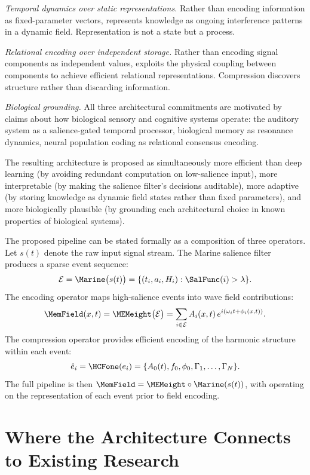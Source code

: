 \textit{Temporal dynamics over static representations.}
Rather than encoding information as fixed-parameter vectors,
\MEMeight{} represents knowledge as ongoing interference
patterns in a dynamic field. Representation is not a state
but a process.

\textit{Relational encoding over independent storage.}
Rather than encoding signal components as independent values,
\HCFone{} exploits the physical coupling between components
to achieve efficient relational representations. Compression
discovers structure rather than discarding information.

\textit{Biological grounding.} All three architectural
commitments are motivated by claims about how biological
sensory and cognitive systems operate: the auditory system
as a salience-gated temporal processor, biological memory
as resonance dynamics, neural population coding as
relational consensus encoding.

The resulting architecture is proposed as simultaneously
more efficient than deep learning (by avoiding redundant
computation on low-salience input), more interpretable
(by making the salience filter's decisions auditable),
more adaptive (by storing knowledge as dynamic field
states rather than fixed parameters), and more biologically
plausible (by grounding each architectural choice in known
properties of biological systems).

\begin{technote}
The proposed pipeline can be stated formally as a composition
of three operators. Let $s(t)$ denote the raw input signal
stream. The Marine salience filter produces a sparse event
sequence:
\[
  \mathcal{E} = \Marine\bigl(s(t)\bigr)
  = \{(t_i, a_i, H_i) : \SalFunc(i) > \lambda\}.
\]
The \MEMeight{} encoding operator maps high-salience events
into wave field contributions:
\[
  \MemField(x,t) = \MEMeight\bigl(\mathcal{E}\bigr)
  = \sum_{i \in \mathcal{E}} A_i(x,t)\,e^{i(\omega_i t + \phi_i(x,t))}.
\]
The \HCFone{} compression operator provides efficient
encoding of the harmonic structure within each event:
\[
  \hat{e}_i = \HCFone(e_i) = \{A_0(t), f_0, \phi_0,
              \Gamma_1,\ldots,\Gamma_N\}.
\]
The full pipeline is then $\MemField = \MEMeight \circ
\Marine(s(t))$, with \HCFone{} operating on the representation
of each event prior to field encoding.
\end{technote}

\section{Where the Architecture Connects to Existing Research}
\label{sec:architecture-existing}

